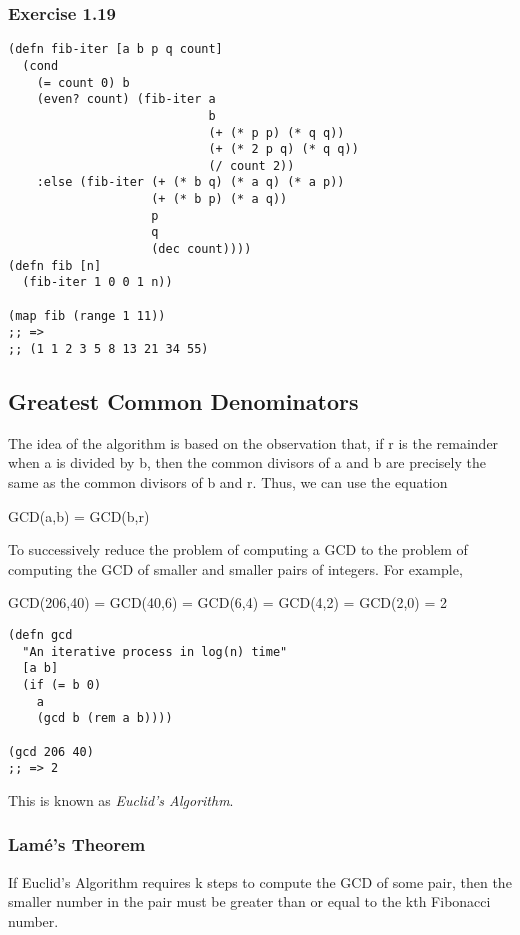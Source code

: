 \documentclass[11pt]{article}
\begin{document}
\subsubsection{Exercise 1.19}
\label{sec-2-4-4}
\begin{verbatim}
(defn fib-iter [a b p q count]
  (cond
    (= count 0) b
    (even? count) (fib-iter a
                            b
                            (+ (* p p) (* q q))
                            (+ (* 2 p q) (* q q))
                            (/ count 2))
    :else (fib-iter (+ (* b q) (* a q) (* a p))
                    (+ (* b p) (* a q))
                    p
                    q
                    (dec count))))
(defn fib [n]
  (fib-iter 1 0 0 1 n))

(map fib (range 1 11))
;; =>
;; (1 1 2 3 5 8 13 21 34 55)
\end{verbatim}

\subsection{Greatest Common Denominators}
\label{sec-2-5}
The idea of the algorithm is based on the observation that, if r is the remainder when a is divided by b, then the common divisors of a and b are precisely the same as the common divisors of b and r. Thus, we can use the equation

GCD(a,b) = GCD(b,r)

To successively reduce the problem of computing a GCD to the problem of computing the GCD of smaller and smaller pairs of integers. For example,

GCD(206,40) = GCD(40,6)
            = GCD(6,4)
            = GCD(4,2)
            = GCD(2,0)
            = 2

\begin{verbatim}
(defn gcd
  "An iterative process in log(n) time"
  [a b]
  (if (= b 0)
    a
    (gcd b (rem a b))))

(gcd 206 40)
;; => 2
\end{verbatim}

This is known as \emph{Euclid's Algorithm}.

\subsubsection{Lamé's Theorem}
\label{sec-2-5-1}
If Euclid's Algorithm requires k steps to compute the GCD of some pair, then the smaller number in the pair must be greater than or equal to the kth Fibonacci number.
\end{document}
